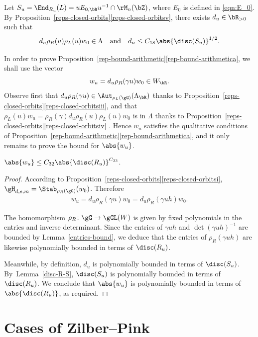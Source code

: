 Let $S_u = \End_{R_u}(L) = uE_{0,\bR}u^{-1} \cap \rM_n(\bZ)$, where $E_0$ is defined in \eqref{eqn:E_0}.
By Proposition~\ref{reps-closed-orbits}\eqref{reps-closed-orbitsv}, there exists $d_u \in \bR_{>0}$ such that
\[
d_u \rho_R(u) \rho_L(u) w_0 \in \Lambda \quad \text{and} \quad d_u \leq C_{18} \abs{\disc(S_u)}^{1/2}.
\]

In order to prove Proposition~\ref{rep-bound-arithmetic}\eqref{rep-bound-arithmetica}, we shall use the vector
\[
w_u = d_u\rho_R(\gamma u)w_0 \in W_\bR.
\]
Observe first that $d_u\rho_R(\gamma u) \in \Aut_{\rho_L(\gG)}(\Lambda_\bR)$ thanks to Proposition~\ref{reps-closed-orbits}\eqref{reps-closed-orbitsiii}, and that $\rho_L(u)w_u = \rho_R(\gamma) d_u \rho_R(u) \rho_L(u) w_0$ is in $\Lambda$ thanks to Proposition~\ref{reps-closed-orbits}\eqref{reps-closed-orbitsiv} .
Hence $w_u$ satisfies the qualitative conditions of Proposition~\ref{rep-bound-arithmetic}\eqref{rep-bound-arithmetica}, and it only remains to prove the bound for $\abs{w_u}$.

\begin{lemma} \label{length-wu}
$\abs{w_u} \leq C_{32} \abs{\disc(R_u)}^{C_{33}}$.
\end{lemma}

\begin{proof}
According to Proposition~\ref{reps-closed-orbits}\eqref{reps-closed-orbitsi}, $\gH_{d,e,m} = \Stab_{\rho_R(\gG)}(w_0)$.
Therefore
\begin{align*}
w_u = d_u\rho_R(\gamma u)w_0 = d_u\rho_R(\gamma uh)w_0.
\end{align*}

The homomorphism $\rho_R \colon \gG \to \gGL(W)$ is given by fixed polynomials in the entries and inverse determinant.
Since the entries of $\gamma uh$ and $\det(\gamma uh)^{-1}$ are bounded by Lemma~\ref{entries-bound}, we deduce that the entries of $\rho_R(\gamma uh)$ are likewise polynomially bounded in terms of $\disc(R_u)$.

Meanwhile, by definition, $d_u$ is polynomially bounded in terms of $\disc(S_u)$.
By~Lem\-ma~\ref{disc-R-S}, $\disc(S_u)$ is polynomially bounded in terms of $\disc(R_u)$.
We conclude that $\abs{w_u}$ is polynomially bounded in terms of $\abs{\disc(R_u)}$, as required.
\end{proof}

\section{Cases of Zilber--Pink}\label{cases-of-ZP}

